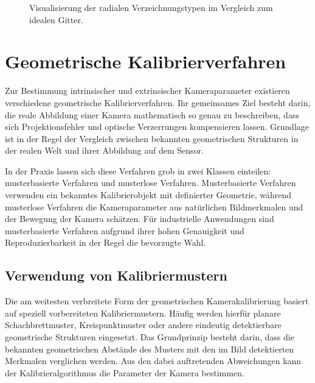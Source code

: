 \documentclass[12pt,a4paper,parskip=half]{scrartcl}
\begin{document}
\begin{figure}[h!]
    \centering
    \caption{Visualisierung der radialen Verzeichnungstypen im Vergleich zum idealen Gitter.}
    \label{fig:distortions}
\end{figure}

\newpage

\section{Geometrische Kalibrierverfahren}
Zur Bestimmung intrinsischer und extrinsischer Kameraparameter existieren verschiedene geometrische Kalibrierverfahren. Ihr gemeinsames Ziel besteht darin, die reale Abbildung einer Kamera mathematisch so genau zu beschreiben, dass sich Projektionsfehler und optische Verzerrungen kompensieren lassen. Grundlage ist in der Regel der Vergleich zwischen bekannten geometrischen Strukturen in der realen Welt und ihrer Abbildung auf dem Sensor.

In der Praxis lassen sich diese Verfahren grob in zwei Klassen einteilen: musterbasierte Verfahren und musterlose Verfahren. Musterbasierte Verfahren verwenden ein bekanntes Kalibrierobjekt mit definierter Geometrie, während musterlose Verfahren die Kameraparameter aus natürlichen Bildmerkmalen und der Bewegung der Kamera schätzen. Für industrielle Anwendungen sind musterbasierte Verfahren aufgrund ihrer hohen Genauigkeit und Reproduzierbarkeit in der Regel die bevorzugte Wahl.

\subsection{Verwendung von Kalibriermustern}
Die am weitesten verbreitete Form der geometrischen Kamerakalibrierung basiert auf speziell vorbereiteten Kalibriermustern. Häufig werden hierfür planare Schachbrettmuster, Kreispunktmuster oder andere eindeutig detektierbare geometrische Strukturen eingesetzt. Das Grundprinzip besteht darin, dass die bekannten geometrischen Abstände des Musters mit den im Bild detektierten Merkmalen verglichen werden. Aus den dabei auftretenden Abweichungen kann der Kalibrieralgorithmus die Parameter der Kamera bestimmen.
\end{document}
